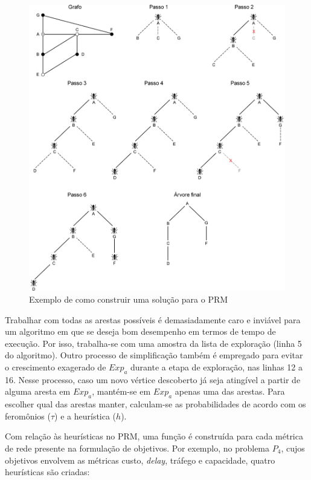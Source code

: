 \begin{figure}[!htbp]	
	\includegraphics[width=1\textwidth]{cap_algoritmo-proposto/figs/exemplo-solucao}
	\caption{\label{fig_exemplo_solucao}Exemplo de como construir uma solução para o PRM}
\end{figure}

Trabalhar com todas as arestas possíveis é demasiadamente caro e inviável para um algoritmo em que se deseja bom desempenho em termos de tempo de execução. Por isso, trabalha-se com uma amostra da lista de exploração (linha 5 do algoritmo). Outro processo de simplificação também é empregado para evitar o crescimento exagerado de $Exp_a$ durante a etapa de exploração, nas linhas 12 a 16. Nesse processo, caso um novo vértice descoberto já seja atingível a partir de alguma aresta em $Exp_a$, mantém-se em $Exp_a$ apenas uma das arestas. Para escolher qual das arestas manter, calculam-se as probabilidades de acordo com os feromônios ($\tau$) e a heurística ($h$).

Com relação às heurísticas no PRM, uma função é construída para cada métrica de rede presente na formulação de objetivos. Por exemplo, no problema $P_4$, cujos objetivos envolvem as métricas custo, \textit{delay}, tráfego e capacidade, quatro heurísticas são criadas:

